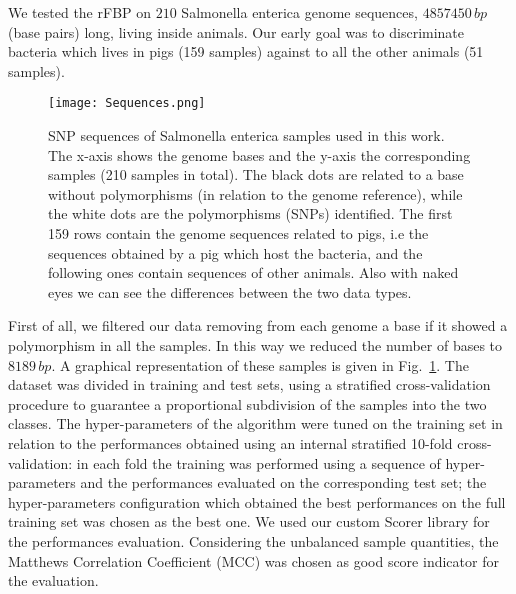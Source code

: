 \documentclass{standalone}
\begin{document}
We tested the \textsf{rFBP} on $210$ Salmonella enterica genome sequences, $4857450\,bp$ (base pairs) long, living inside animals.
Our early goal was to discriminate bacteria which lives in pigs (159 samples) against to all the other animals (51 samples).

\begin{figure}[htbp]
\centering
% 
\texttt{[image: Sequences.png]}
\caption{SNP sequences of Salmonella enterica samples used in this work.
The x-axis shows the genome bases and the y-axis the corresponding samples (210 samples in total).
The black dots are related to a base without polymorphisms (in relation to the genome reference), while the white dots are the polymorphisms (SNPs) identified.
The first 159 rows contain the genome sequences related to pigs, i.e the sequences obtained by a pig which host the bacteria, and the following ones contain sequences of other animals.
Also with naked eyes we can see the differences between the two data types.
}
\label{fig:SNPsAle}
\end{figure}

First of all, we filtered our data removing from each genome a base if it showed a polymorphism in all the samples.
In this way we reduced the number of bases to $8189\,bp$.
A graphical representation of these samples is given in Fig.~\ref{fig:SNPsAle}.
The dataset was divided in training and test sets, using a stratified cross-validation procedure to guarantee a proportional subdivision of the samples into the two classes.
The hyper-parameters of the algorithm were tuned on the training set in relation to the performances obtained using an internal stratified 10-fold cross-validation: in each fold the training was performed using a sequence of hyper-parameters and the performances evaluated on the corresponding test set; the hyper-parameters configuration which obtained the best performances on the full training set was chosen as the best one.
We used our custom \textsf{Scorer} library for the performances evaluation.
Considering the unbalanced sample quantities, the Matthews Correlation Coefficient (MCC) was chosen as good score indicator for the evaluation.
\end{document}

